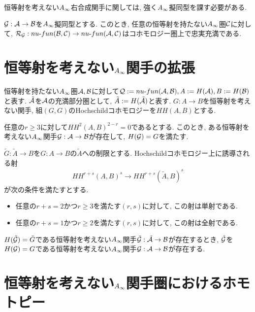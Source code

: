\documentclass[uplatex, a4paper, 14Q, dvipdfmx]{jsarticle}
\begin{document}
恒等射を考えない$A_{\infty}$右合成関手に関しては, 強く$A_{\infty}$擬同型を課す必要がある. 

\begin{lemma} \label{prop_RG_is_also_cohomologically_fully_faithful}
  $\mathcal{G} :\mathcal{A} \to \mathcal{B}$を$A_{\infty}$擬同型とする. 
  このとき, 任意の恒等射を持たない$A_{\infty}$圏$\mathcal{C}$に対して, $\mathcal{R}_{\mathcal{G}} : nu \text{-} fun (\mathcal{B}, \mathcal{C}) \to nu \text{-} fun (\mathcal{A}, \mathcal{C})$はコホモロジー圏上で忠実充満である. 
\end{lemma}

\section{恒等射を考えない\texorpdfstring{$A_{\infty}$}{Ainf}関手の拡張}

恒等射を持たない$A_{\infty}$圏$\mathcal{A}, \mathcal{B}$に対して$\mathcal{Q} := nu \text{-} fun (\mathcal{A}, \mathcal{B}), A := H(\mathcal{A}), B := H(\mathcal{B})$と表す. 
$\tilde{\mathcal{A}}$を$\mathcal{A}$の充満部分圏として, $\tilde{A} := H(\tilde{\mathcal{A}})$と表す. 
$G : A \to B$を恒等射を考えない関手, 組$(G,G)$のHochschildコホモロジーを$HH(A,B)$とする.  

\begin{lemma}
  任意の$r \geq 3$に対して$HH^2(A,B)^{2-r} = 0$であるとする.
  このとき, ある恒等射を考えない$A_{\infty}$関手$\mathcal{G} : \mathcal{A} \to \mathcal{B}$が存在して, $H(\mathcal{G}) = G$を満たす. 
\end{lemma}

\begin{lemma}
  $\tilde{G} : \tilde{A} \to B$を$G : A \to B$の$\tilde{A}$への制限とする.
  Hochschildコホモロジー上に誘導される射
  \begin{align*}
    HH^{r+s}(A,B)^s \to HH^{r+s}(\tilde{A},B)^s
  \end{align*}
  が次の条件を満たすとする.
  \begin{itemize}
    \item 任意の$r + s = 2$かつ$r \geq 3$を満たす$(r,s)$に対して, この射は単射である.
    \item 任意の$r + s = 1$かつ$r \geq 2$を満たす$(r,s)$に対して, この射は全射である.
  \end{itemize}
  $H(\tilde{\mathcal{G}}) = \tilde{G}$である恒等射を考えない$A_{\infty}$関手$\tilde{\mathcal{G}} : \tilde{\mathcal{A}} \to \mathcal{B}$が存在するとき, $\tilde{\mathcal{G}}$を$H(\mathcal{G}) = G$である恒等射を考えない$A_{\infty}$関手$\mathcal{G} : \mathcal{A} \to \mathcal{B}$が存在する.
\end{lemma}

\section{恒等射を考えない\texorpdfstring{$A_{\infty}$}{Ainf}関手圏におけるホモトピー}
\end{document}

